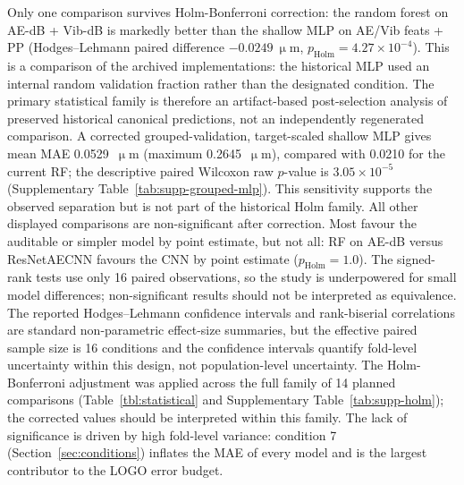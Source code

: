 \begin{table}[htbp]
\centering
\caption{Historical canonical benchmark pairwise statistical tests (Holm-Bonferroni corrected
across the full family of 14 planned comparisons). HL \(\Delta\) is the
Hodges--Lehmann paired location shift for model~A minus model~B, with an
unadjusted descriptive bootstrap 95\% confidence interval; \(r_{rb}\) is the Wilcoxon
rank-biserial correlation. Negative values favour model~A.}\label{tbl:statistical}
\resizebox{\linewidth}{!}{}
\end{table}

Only one comparison survives Holm-Bonferroni correction: the random
forest on AE-dB + Vib-dB is markedly better than the shallow MLP on
AE/Vib feats + PP (Hodges--Lehmann paired difference
\(-0.0249~\upmu\)m, \(p_{\text{Holm}}=4.27\times10^{-4}\)). This is a
comparison of the archived implementations: the historical MLP used an
internal random validation fraction rather than the designated condition.
The primary statistical family is therefore an artifact-based post-selection
analysis of preserved historical canonical predictions, not an independently
regenerated comparison.
A corrected grouped-validation, target-scaled shallow MLP gives mean MAE
0.0529~\(\upmu\)m (maximum 0.2645~\(\upmu\)m), compared with 0.0210 for
the current RF; the descriptive paired Wilcoxon raw \(p\)-value is
\(3.05\times10^{-5}\) (Supplementary
Table~\ref{tab:supp-grouped-mlp}). This sensitivity supports the observed
separation but is not part of the historical Holm family. All other
displayed comparisons are non-significant after correction. Most favour
the auditable or simpler model by point estimate, but not all:
RF on AE-dB versus ResNetAECNN favours the CNN by point estimate
(\(p_{\text{Holm}}=1.0\)). The signed-rank tests use
only 16 paired observations, so the study is underpowered for small
model differences; non-significant results should not be interpreted as
equivalence. The reported Hodges--Lehmann confidence intervals and
rank-biserial correlations are standard non-parametric effect-size
summaries, but the effective paired sample size is 16 conditions and the
confidence intervals quantify fold-level uncertainty within this design,
not population-level uncertainty. The Holm-Bonferroni
adjustment was applied across the full family of 14 planned
comparisons (Table~\ref{tbl:statistical} and Supplementary
Table~\ref{tab:supp-holm}); the corrected values should be interpreted
within this family. The lack of significance is driven by high fold-level
variance: condition 7 (Section~\ref{sec:conditions}) inflates the MAE of
every model and is the largest contributor to the LOGO error budget.

